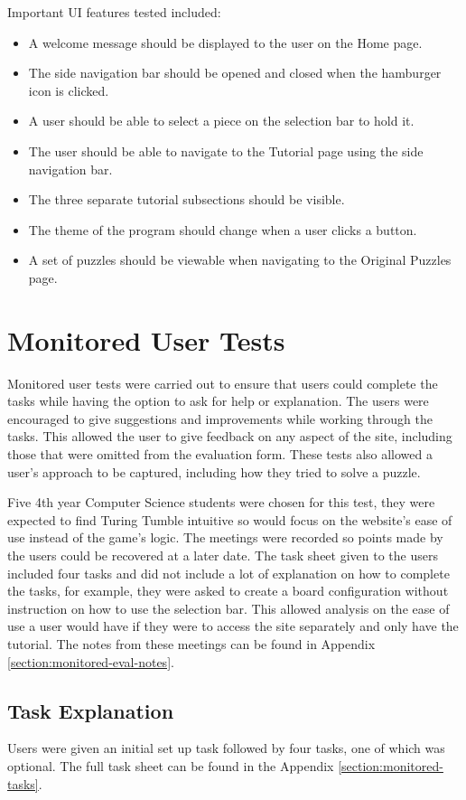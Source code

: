 \documentclass{l4proj}
\begin{document}
Important UI features tested included:
\begin{itemize}
    \item A welcome message should be displayed to the user on the Home page.
    \item The side navigation bar should be opened and closed when the hamburger icon is clicked.
    \item A user should be able to select a piece on the selection bar to hold it.
    \item The user should be able to navigate to the Tutorial page using the side navigation bar.
    \item The three separate tutorial subsections should be visible.
    \item The theme of the program should change when a user clicks a button.
    \item A set of puzzles should be viewable when navigating to the Original Puzzles page.
\end{itemize}

\section{Monitored User Tests}
Monitored user tests were carried out to ensure that users could complete the tasks while having the option to ask for help or explanation. The users were encouraged to give suggestions and improvements while working through the tasks. This allowed the user to give feedback on any aspect of the site, including those that were omitted from the evaluation form. These tests also allowed a user's approach to be captured, including how they tried to solve a puzzle. 

Five 4th year Computer Science students were chosen for this test, they were expected to find Turing Tumble intuitive so would focus on the website's ease of use instead of the game's logic. The meetings were recorded so points made by the users could be recovered at a later date. The task sheet given to the users included four tasks and did not include a lot of explanation on how to complete the tasks, for example, they were asked to create a board configuration without instruction on how to use the selection bar. This allowed analysis on the ease of use a user would have if they were to access the site separately and only have the tutorial. The notes from these meetings can be found in Appendix \ref{section:monitored-eval-notes}.

\subsection{Task Explanation}
\label{taskExplanation}
Users were given an initial set up task followed by four tasks, one of which was optional. The full task sheet can be found in the Appendix \ref{section:monitored-tasks}. 
\end{document}
